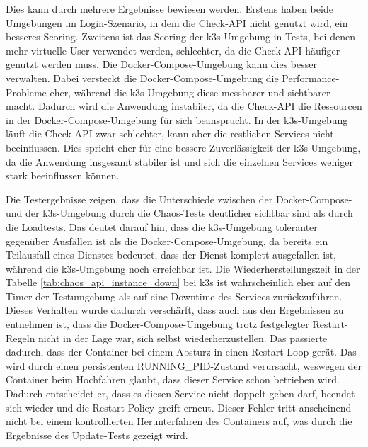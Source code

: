 Dies kann durch mehrere Ergebnisse bewiesen werden. Erstens haben beide Umgebungen im Login-Szenario, in dem die Check-API nicht genutzt wird, ein besseres Scoring.
Zweitens ist das Scoring der k3s-Umgebung in Tests, bei denen mehr virtuelle User verwendet werden, schlechter, da die Check-API häufiger genutzt werden muss. Die Docker-Compose-Umgebung kann dies besser verwalten.
Dabei versteckt die Docker-Compose-Umgebung die Performance-Probleme eher, während die k3s-Umgebung diese messbarer und sichtbarer macht.
Dadurch wird die Anwendung instabiler, da die Check-API die Ressourcen in der Docker-Compose-Umgebung für sich beansprucht. In der k3s-Umgebung läuft die Check-API zwar schlechter, kann aber die restlichen Services nicht beeinflussen.
Dies spricht eher für eine bessere Zuverlässigkeit der k3s-Umgebung, da die Anwendung insgesamt stabiler ist und sich die einzelnen Services weniger stark beeinflussen können.

Die Testergebnisse zeigen, dass die Unterschiede zwischen der Docker-Compose- und der k3s-Umgebung durch die Chaos-Tests deutlicher sichtbar sind als durch die Loadtests.
Das deutet darauf hin, dass die k3s-Umgebung toleranter gegenüber Ausfällen ist als die Docker-Compose-Umgebung, da bereits ein Teilausfall eines Dienstes bedeutet, dass der Dienst komplett ausgefallen ist, während die k3s-Umgebung noch erreichbar ist.
Die Wiederherstellungszeit in der Tabelle \ref{tab:chaos_api_instance_down} bei k3s ist wahrscheinlich eher auf den Timer der Testumgebung als auf eine Downtime des Services zurückzuführen.
Dieses Verhalten wurde dadurch verschärft, dass auch aus den Ergebnissen zu entnehmen ist, dass die Docker-Compose-Umgebung trotz festgelegter Restart-Regeln nicht in der Lage war, sich selbst wiederherzustellen.
Das passierte dadurch, dass der Container bei einem Absturz in einen Restart-Loop gerät.
Das wird durch einen persistenten RUNNING\_PID-Zustand verursacht, weswegen der Container beim Hochfahren glaubt, dass dieser Service schon betrieben wird. Dadurch entscheidet er, dass es diesen Service nicht doppelt geben darf, beendet sich wieder und die Restart-Policy greift erneut.
Dieser Fehler tritt anscheinend nicht bei einem kontrollierten Herunterfahren des Containers auf, was durch die Ergebnisse des Update-Tests gezeigt wird. 

